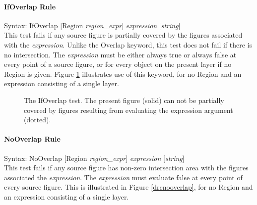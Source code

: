 \paragraph{{\et IfOverlap} Rule}

\begin{description}
\item{Syntax: {\vt IfOverlap} [{\vt Region} {\it region\_expr\/}]
    {\it expression} [{\it string\/}]}\\

This test fails if any source figure is partially covered by the
figures associated with the {\it expression\/}.  Unlike the {\et
Overlap} keyword, this test does not fail if there is no intersection. 
The {\it expression} must be either always true or always false at
every point of a source figure, or for every object on the present
layer if no {\et Region} is given.  Figure \ref{drcifoverlap}
illustrates use of this keyword, for no {\et Region} and an expression
consisting of a single layer.
\end{description}

\begin{figure}
\caption{\label{drcifoverlap} The {\et IfOverlap} test.  The present figure
(solid) can not be partially covered by figures resulting from evaluating
the expression argument (dotted).}
\vspace{1.5ex}
\begin{center}
\end{center}
\end{figure}

\paragraph{{\et NoOverlap} Rule}

\begin{description}
\item{Syntax: {\vt NoOverlap} [{\vt Region} {\it region\_expr\/}]
    {\it expression} [{\it string\/}]}\\

This test fails if any source figure has non-zero intersection area
with the figures associated the {\it expression\/}.  The {\it
expression} must evaluate false at every point of every source figure. 
This is illustrated in Figure \ref{drcnooverlap}, for no {\et Region}
and an expression consisting of a single layer. 
\end{description}

